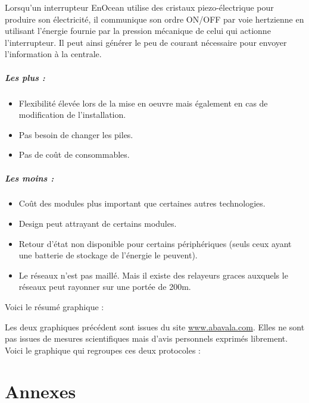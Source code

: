 \documentclass[a4paper,10pt]{article}
\begin{document}
Lorsqu’un interrupteur EnOcean utilise des cristaux piezo-électrique pour produire son électricité, il communique son ordre ON/OFF par voie hertzienne en utilisant l’énergie fournie par la pression mécanique de celui qui actionne l’interrupteur. Il peut ainsi générer le peu de courant nécessaire pour envoyer l’information à la centrale.

\subparagraph{Les plus :}
\begin{itemize}
\item Flexibilité élevée lors de la mise en oeuvre mais également en cas de modification de l'installation.
\item Pas besoin de changer les piles.
\item Pas de coût de consommables.
\end{itemize}
\subparagraph{Les moins :}
\begin{itemize}
\item Coût des modules plus important que certaines autres technologies.
\item Design peut attrayant de certains modules.
\item Retour d'état non disponible pour certains périphériques (seuls ceux ayant une batterie de stockage de l'énergie le peuvent).
\item Le réseaux n'est pas maillé. Mais il existe des relayeurs graces auxquels le réseaux peut rayonner sur une portée de 200m.\newline
\end{itemize}


Voici le résumé graphique :

Les deux graphiques précédent sont issues du site \url{www.abavala.com}. Elles ne sont pas issues de mesures scientifiques mais d’avis personnels exprimés librement. Voici le graphique qui regroupes ces deux protocoles :


\section{Annexes}


 
\end{document}
